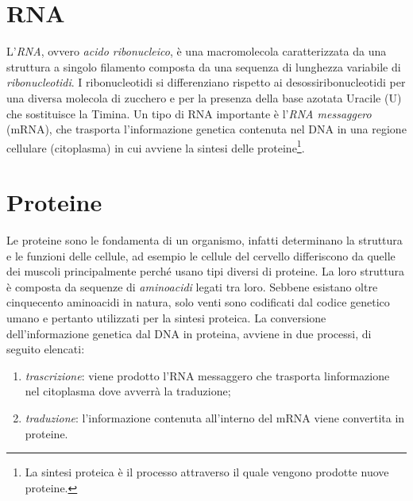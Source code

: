 \section{RNA}
L'\textit{RNA}, ovvero \textit{acido ribonucleico}, è una macromolecola caratterizzata da una struttura a singolo filamento composta da una sequenza di lunghezza variabile di \textit{ribonucleotidi}.
\newline
I ribonucleotidi si differenziano rispetto ai desossiribonucleotidi per una diversa molecola di zucchero e per la presenza della base azotata Uracile (U) che sostituisce la Timina.
\newline
Un tipo di RNA importante è l'\textit{RNA messaggero} (mRNA), che trasporta l'informazione genetica contenuta nel DNA in una regione cellulare (citoplasma) in cui avviene la sintesi delle proteine\footnote{La sintesi proteica è il processo attraverso il quale vengono prodotte nuove proteine.}.

\section{Proteine}
Le proteine sono le fondamenta di un organismo, infatti determinano la struttura e le funzioni delle cellule, ad esempio le cellule del cervello differiscono da quelle dei muscoli principalmente perché usano tipi diversi di proteine.
La loro struttura è composta da sequenze di \textit{aminoacidi} legati tra loro.
\newline
Sebbene esistano oltre cinquecento aminoacidi in natura, solo venti sono codificati dal codice genetico umano e pertanto utilizzati per la sintesi proteica.
\newline
La conversione dell'informazione genetica dal DNA in proteina, avviene in due processi, di seguito elencati:
\begin{enumerate}
	\item \textit{trascrizione}: viene prodotto l'RNA messaggero che trasporta l\?informazione nel citoplasma dove avverrà la traduzione;
	\item \textit{traduzione}: l'informazione contenuta all'interno del mRNA viene convertita in proteine.
\end{enumerate}
